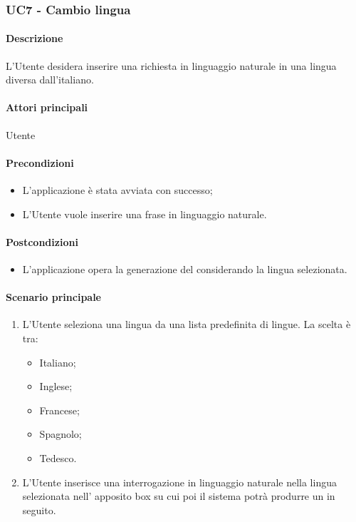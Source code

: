 \subsubsection{UC7 - Cambio lingua}\label{UC7}
\paragraph*{Descrizione}
L’Utente desidera inserire una richiesta in linguaggio naturale in una lingua diversa dall’italiano.

\paragraph*{Attori principali}
Utente

\paragraph*{Precondizioni}
\begin{itemize}
  \item L'applicazione è stata avviata con successo;
  \item L’Utente vuole inserire una frase in linguaggio naturale.
\end{itemize}

\paragraph*{Postcondizioni}
\begin{itemize}
  \item L'applicazione opera la generazione del  considerando la lingua selezionata.
\end{itemize}

\paragraph*{Scenario principale}
\begin{enumerate}
  \item L’Utente seleziona una lingua da una lista predefinita di lingue. La scelta è tra:
    \begin{itemize}
      \item Italiano;
      \item Inglese;
      \item Francese;
      \item Spagnolo;
      \item Tedesco.
    \end{itemize}
  \item L’Utente inserisce una interrogazione in linguaggio naturale nella lingua selezionata nell’ apposito box su cui poi il sistema potrà produrre un  in seguito. 
\end{enumerate}

